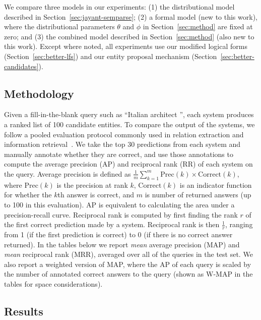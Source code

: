 \documentclass[11pt,letterpaper]{article}
\newcommand{\secref}[1]{Section~\ref{sec:#1}}
\newcommand{\blank}{\underline{\hspace{.5cm}}}
\begin{document}
We compare three models in our experiments: (1) the distributional model
described in \secref{jayant-semparse}; (2) a formal model (new to this work),
where the distributional parameters $\theta$ and $\phi$ in \secref{method} are
fixed at zero; and (3) the combined model described in \secref{method} (also
new to this work).  Except where noted, all experiments use our modified
logical forms (\secref{better-lfs}) and our entity proposal mechanism
(\secref{better-candidates}).

\subsection{Methodology}

Given a fill-in-the-blank query such as ``Italian architect \blank{}'', each
system produces a ranked list of 100 candidate entities.  To compare the output
of the systems, we follow a pooled evaluation protocol commonly used in
relation extraction and information
retrieval~\cite{west-2014-kbc-via-qa,riedel-2013-mf-universal-schema}.  We take
the top 30 predictions from each system and manually annotate whether they are
correct, and use those annotations to compute the average precision (AP) and
reciprocal rank (RR) of each system on the query.  Average precision is defined
as $\frac{1}{m}\sum^m_{k=1} \mathrm{Prec}(k) \times \mathrm{Correct}(k)$, where
$\mathrm{Prec}(k)$ is the precision at rank $k$, $\mathrm{Correct}(k)$ is an
indicator function for whether the $k$th answer is correct, and $m$ is number
of returned answers (up to 100 in this evaluation).  AP is equivalent to
calculating the area under a precision-recall curve.  Reciprocal rank is
computed by first finding the rank $r$ of the first correct prediction made by
a system.  Reciprocal rank is then $\frac{1}{r}$, ranging from 1 (if the first
prediction is correct) to 0 (if there is no correct answer returned).  In the
tables below we report \emph{mean} average precision (MAP) and \emph{mean}
reciprocal rank (MRR), averaged over all of the queries in the test set.  We
also report a weighted version of MAP, where the AP of each query is scaled by
the number of annotated correct answers to the query (shown as W-MAP in the
tables for space considerations).

\subsection{Results}
\end{document}

